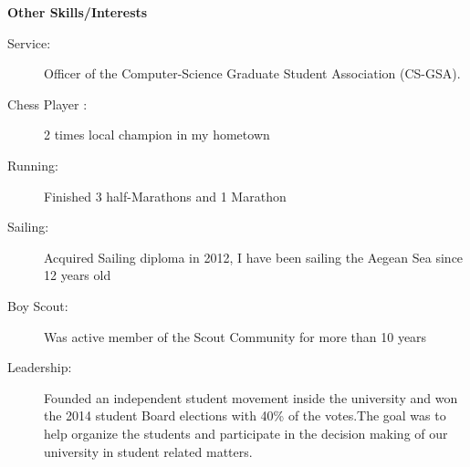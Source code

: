 \documentclass[letterpaper,11pt]{article}
\newcommand{\resheading}[1]{{\large \colorbox{mygrey}{\begin{minipage}{\textwidth}{\textbf{#1 \vphantom{p\^{E}}}}\end{minipage}}}}
\begin{document}
\resheading{Other Skills/Interests}
\begin{description}
	\item [Service:] Officer of the Computer-Science Graduate Student Association  (CS-GSA).
	\item[Chess Player :] 2 times local champion in my hometown
	\item[Running:] Finished 3 half-Marathons and 1 Marathon
	\item[Sailing:] Acquired Sailing diploma in 2012, I have been sailing the Aegean Sea since 12 years old
	\item[Boy Scout:]Was active member of the Scout Community for more than 10 years
	\item[Leadership:]Founded an independent student movement inside the university and won the 2014 student Board elections with 40\% of the votes.The  goal was to help organize the students and participate in the decision making of our university in student related matters.
\end{description}
	
\end{document}
